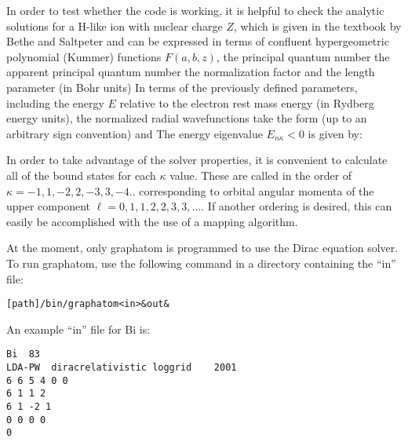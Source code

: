 \documentclass[11pt]{article}
\begin{document}
In order to test whether the code is working, it is helpful to check
the analytic solutions for a H-like ion with nuclear charge $Z$,
which is given in the textbook by Bethe and Saltpeter\cite{BandS}
and can be expressed in terms of confluent hypergeometric polynomial 
(Kummer) functions\cite{HBMF} $F(a,b,z)$, the principal quantum
number 
the apparent principal quantum number
the normalization factor
and the length parameter (in Bohr units)
In terms of the previously defined parameters, including the
energy $E$ relative to the electron rest mass energy (in
Rydberg energy units), the
normalized radial wavefunctions take the form  (up to an arbitrary sign
convention)
and
The energy eigenvalue $E_{n \kappa} < 0$ is given by:

In order to take advantage of the solver properties, it is convenient
to calculate all of the bound states for each $\kappa$ value.   These
are called in the order of $\kappa = -1, 1, -2, 2, -3, 3, -4 ..$ 
corresponding to orbital angular momenta of the upper component
$\ell = 0, 1, 1, 2, 2, 3, 3, ...$.    If another ordering is
desired, this can easily be accomplished with the use of a mapping
algorithm.   

At the moment, only graphatom is programmed to use the Dirac equation
solver.     To run graphatom, use the following command in a directory
containing the ``in'' file:

\begin{verbatim}
[path]/bin/graphatom<in>&out&
\end{verbatim}

An example ``in'' file for Bi is:

\begin{verbatim}
Bi  83             
LDA-PW  diracrelativistic loggrid    2001
6 6 5 4 0 0
6 1 1 2
6 1 -2 1
0 0 0 0
0
\end{verbatim}
\end{document}
